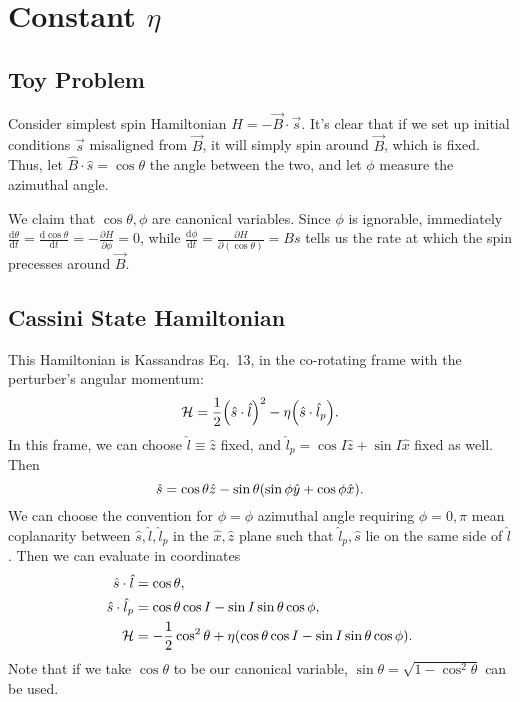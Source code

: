\documentclass[11pt,
        usenames, %
        dvipsnames %
    ]{article}
\newcommand*{\rd}[2]{\frac{\mathrm{d}#1}{\mathrm{d}#2}}
\newcommand*{\pd}[2]{\frac{\partial#1}{\partial#2}}
\DeclarePairedDelimiter\p{\lparen}{\rparen}
\begin{document}
\def\Snospace~{\S{}} %
\renewcommand*{\sectionautorefname}{\Snospace}
\renewcommand*{\appendixautorefname}{\Snospace}
\renewcommand*{\figureautorefname}{Fig.}
\renewcommand*{\equationautorefname}{Eq.}
\renewcommand*{\tableautorefname}{Tab.}

\section{Constant $\eta$}

\subsection{Toy Problem}

Consider simplest spin Hamiltonian $H = -\vec{B} \cdot \vec{s}$. It's clear that
if we set up initial conditions $\vec{s}$ misaligned from $\vec{B}$, it will
simply spin around $\vec{B}$, which is fixed. Thus, let $\hat{B} \cdot \hat{s} =
\cos \theta$ the angle between the two, and let $\phi$ measure the azimuthal
angle.

We claim that $\cos \theta, \phi$ are canonical variables. Since $\phi$ is
ignorable, immediately $\rd{\theta}{t} = \rd{\cos \theta}{t} = -\pd{H}{\phi} =
0$, while $\rd{\phi}{t} = \pd{H}{(\cos \theta)} = Bs$ tells us the rate at which
the spin precesses around $\vec{B}$.

\subsection{Cassini State Hamiltonian}

This Hamiltonian is Kassandras Eq.\ 13, in the co-rotating frame with the
perturber's angular momentum:
\begin{equation}
    \mathcal{H} = \frac{1}{2}\p*{\hat{s} \cdot \hat{l}}^2
        - \eta \p*{\hat{s} \cdot \hat{l}_p}.
\end{equation}
In this frame, we can choose $\hat{l} \equiv \hat{z}$ fixed, and $\hat{l}_p =
\cos I\hat{z} + \sin I\hat{x}$ fixed as well. Then
\begin{equation*}
    \hat{s} = \cos\theta \hat{z}
        - \sin\theta\p*{\sin \phi \hat{y} + \cos \phi \hat{x}}.
\end{equation*}
We can choose the convention for $\phi = \phi$ azimuthal angle requiring $\phi =
0, \pi$ mean coplanarity between $\hat{s}, \hat{l}, \hat{l}_p$ in the $\hat{x},
\hat{z}$ plane such that $\hat{l}_p, \hat{s}$ lie on the same side of
$\hat{l}$. Then we can evaluate in coordinates
\begin{align*}
    \hat{s} \cdot \hat{l} &= \cos \theta,\\
    \hat{s} \cdot \hat{l}_p
        &= \cos \theta \cos I - \sin I \sin \theta \cos \phi,\\
    \mathcal{H} &= -\frac{1}{2}\cos^2\theta
        + \eta \p*{\cos \theta \cos I - \sin I \sin \theta \cos \phi}.
\end{align*}
Note that if we take $\cos\theta$ to be our canonical variable, $\sin\theta =
\sqrt{1 - \cos^2\theta}$ can be used.
\end{document}

